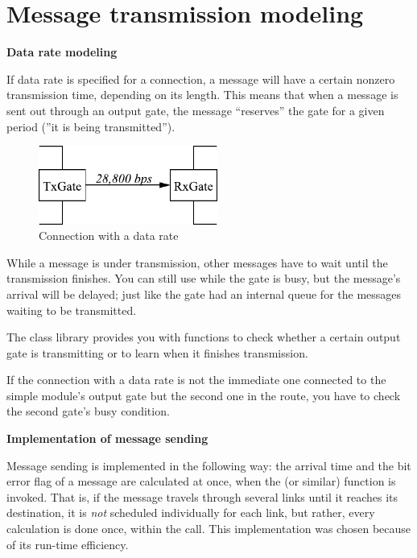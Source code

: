\section{Message transmission modeling}

\textbf{Data rate modeling}


If data rate is specified for a connection, a message
will have a certain nonzero transmission time, depending on its length.  This means that when a message is
sent out through an output gate, the message ``reserves'' the gate for
a given period (''it is being transmitted'').

\begin{figure}[htbp]
  \begin{center}
    \includegraphics[width=2.315in, height=1.015in]{figures/usmanFig9}
    \caption{Connection with a data rate}
    \label{fig:ch-simple-modules:conn-w-data-rate}
  \end{center}
\end{figure}

While a message is under transmission, other messages have to wait
until the transmission finishes. You can still use 
while the gate is busy, but the message's arrival will be delayed;
just like the gate had an internal queue for the messages waiting to
be transmitted.


The {\opp} class library provides you with functions to check
whether a certain output gate is transmitting or to learn when
it finishes transmission.


If the connection with a data rate is not the immediate one connected
to the simple module's output gate but the second
one in the route, you have to check the second gate's busy
condition.


\textbf{Implementation of message sending}


Message sending is implemented in the following way: the arrival
time and the bit error flag of a
message are calculated at once, when the  (or similar)
function is invoked. That is, if the message travels through several
links until it reaches its destination, it is \textit{not} scheduled
individually for each link, but rather, every calculation is done
once, within the  call. This implementation was chosen
because of its run-time efficiency.

